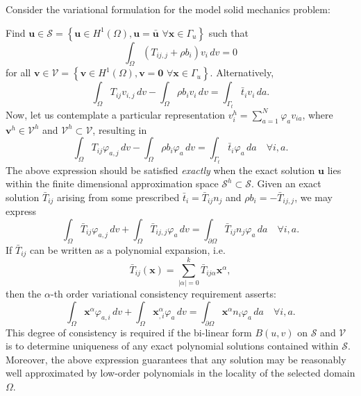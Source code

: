 
Consider the variational formulation for the model solid mechanics problem:

Find $\mathbf{u} \in \mathcal{S} = \left\{ \mathbf{u} \in H^1(\Omega), \mathbf{u} = \bar{\mathbf{u}} \, \, \forall \mathbf{x} \in \Gamma_u \right\}$ such that
\begin{equation}
  \int_\Omega (T_{ij,j} + \rho b_i) v_i \, dv = 0
\end{equation}
for all $\mathbf{v} \in \mathcal{V} = \left\{ \mathbf{v} \in H^1(\Omega), \mathbf{v} = \mathbf{0} \, \, \forall \mathbf{x} \in \Gamma_u \right\}$. Alternatively,
\begin{equation}
  \int_\Omega T_{ij} v_{i,j} \, dv - \int_\Omega \rho b_i v_i \, dv = \int_{\Gamma_t} \bar{t}_i v_i \, da.
\end{equation}
Now, let us contemplate a particular representation $v^h_i = \sum_{a=1}^N \varphi_a v_{ia}$, where $\mathbf{v}^h \in \mathcal{V}^h$ and $\mathcal{V}^h \subset \mathcal{V}$, resulting in
\begin{equation}
  \int_\Omega T_{ij} \varphi_{a,j} \, dv - \int_\Omega \rho b_i \varphi_a \, dv = \int_{\Gamma_t} \bar{t}_i \varphi_a \, da \quad \forall i, a.
\end{equation}
The above expression should be satisfied \textit{exactly} when the exact solution $\mathbf{u}$ lies within the finite dimensional approximation space $\mathcal{S}^h \subset \mathcal{S}$. Given an exact solution $\bar{T}_{ij}$ arising from some prescribed $\bar{t}_i = \bar{T}_{ij} n_j$ and $\rho b_i = - \bar{T}_{ij,j}$, we may express
\begin{equation}
  \int_\Omega \bar{T}_{ij} \varphi_{a,j} \, dv + \int_\Omega \bar{T}_{ij,j} \varphi_a \, dv = \int_{\partial \Omega} \bar{T}_{ij} n_j \varphi_a \, da \quad \forall i, a.
\end{equation}
If $\bar{T}_{ij}$ can be written as a polynomial expansion, i.e.
\begin{equation}
  \bar{T}_{ij} (\mathbf{x}) = \sum_{|\alpha| = 0}^k \bar{T}_{ij\alpha} \mathbf{x}^\alpha,
\end{equation}
then the $\alpha$-th order variational consistency requirement asserts:
\begin{equation}
  \int_\Omega \mathbf{x}^{\alpha} \varphi_{a,i} \, dv + \int_\Omega \mathbf{x}^{\alpha}_{,i} \varphi_a \, dv = \int_{\partial \Omega} \mathbf{x}^{\alpha} n_i \varphi_a \, da \quad \forall i, a.
\end{equation}
This degree of consistency is required if the bi-linear form $B(u,v)$ on $\mathcal{S}$ and $\mathcal{V}$ is to determine uniqueness of any exact polynomial solutions contained within $\mathcal{S}$. Moreover, the above expression guarantees that any solution may be reasonably well approximated by low-order polynomials in the locality of the selected domain $\Omega$.

